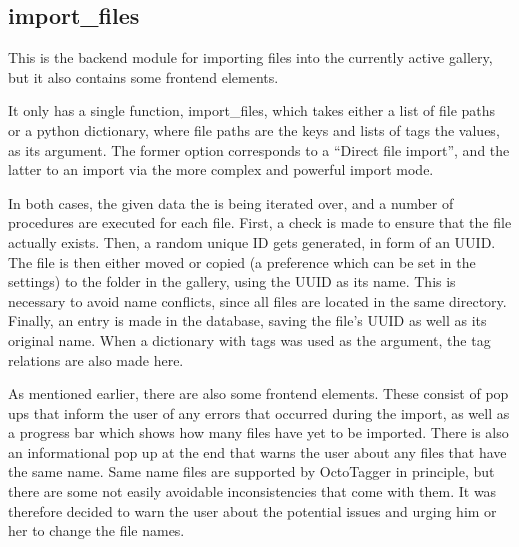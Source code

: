 \subsection{import\_files}
\def\kapitelautor{Erik Ritschl}

This is the backend module for importing files into the currently active
gallery, but it also contains some frontend elements.

It only has a single function, import\_files, which takes either a
list of file paths or a python dictionary, where file paths are the keys and
lists of tags the values, as its argument. The former option corresponds to a
``Direct file import'', and the latter to an import via the more complex and
powerful import mode.

In both cases, the given data the is being iterated over, and a number of
procedures are executed for each file. First, a check is made to ensure that
the file actually exists. Then, a random unique ID gets generated, in form of
an UUID. The file is then either moved or copied (a preference
which can be set in the settings) to the  folder in the gallery,
using the UUID as its name. This is necessary to avoid name
conflicts, since all files are located in the same directory. Finally, an entry
is made in the database, saving the file's UUID as well as its
original name. When a dictionary with tags was used as the argument, the tag relations
are also made here.

As mentioned earlier, there are also some frontend elements. These consist of
pop ups that inform the user of any errors that occurred during the import, as
well as a progress bar which shows how many files have yet to be imported.
There is also an informational pop up at the end that warns the user about any
files that have the same name. Same name files are supported by OctoTagger in
principle, but there are some not easily avoidable inconsistencies that come
with them. It was therefore decided to warn the user about the potential issues
and urging him or her to change the file names.
